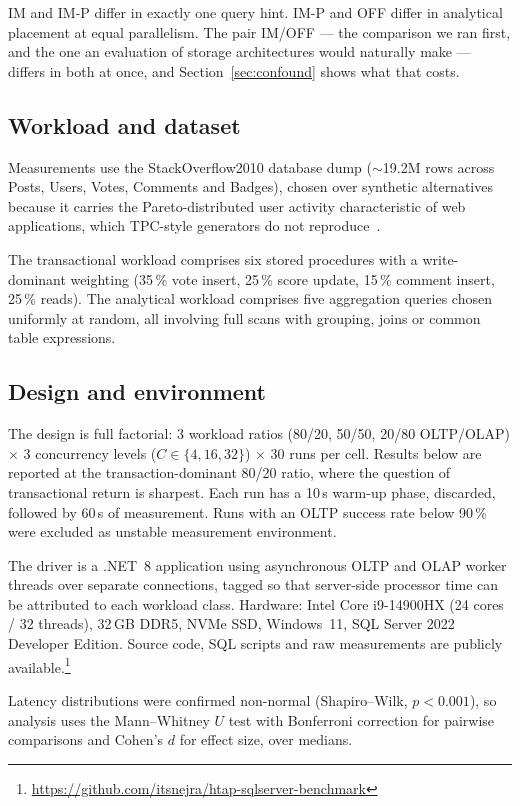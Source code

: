 \documentclass[conference,a4paper]{IEEEtran}
\begin{document}
IM and IM-P differ in exactly one query hint. IM-P and OFF differ in analytical
placement at equal parallelism. The pair IM/OFF --- the comparison we ran
first, and the one an evaluation of storage architectures would naturally make
--- differs in both at once, and Section~\ref{sec:confound} shows what that
costs.

\subsection{Workload and dataset}

Measurements use the StackOverflow2010 database dump ($\sim$19.2M rows across
Posts, Users, Votes, Comments and Badges), chosen over synthetic alternatives
because it carries the Pareto-distributed user activity characteristic of web
applications, which TPC-style generators do not
reproduce~\cite{zhang2024hybench}.

The transactional workload comprises six stored procedures with a
write-dominant weighting (35\,\% vote insert, 25\,\% score update, 15\,\%
comment insert, 25\,\% reads). The analytical workload comprises five
aggregation queries chosen uniformly at random, all involving full scans with
grouping, joins or common table expressions.

\subsection{Design and environment}

The design is full factorial: 3 workload ratios (80/20, 50/50, 20/80
OLTP/OLAP) $\times$ 3 concurrency levels ($C \in \{4, 16, 32\}$) $\times$ 30
runs per cell. Results below are reported at the transaction-dominant 80/20
ratio, where the question of transactional return is sharpest. Each run has a
10\,s warm-up phase, discarded, followed by 60\,s of measurement. Runs with an
OLTP success rate below 90\,\% were excluded as unstable measurement
environment.

The driver is a .NET~8 application using asynchronous OLTP and OLAP worker
threads over separate connections, tagged so that server-side processor time
can be attributed to each workload class. Hardware: Intel Core i9-14900HX
(24 cores / 32 threads), 32\,GB DDR5, NVMe SSD, Windows~11, SQL Server 2022
Developer Edition. Source code, SQL scripts and raw measurements are publicly
available.\footnote{\url{https://github.com/itsnejra/htap-sqlserver-benchmark}}

Latency distributions were confirmed non-normal (Shapiro--Wilk, $p < 0.001$),
so analysis uses the Mann--Whitney $U$ test with Bonferroni correction for
pairwise comparisons and Cohen's $d$ for effect size, over medians.
\end{document}
